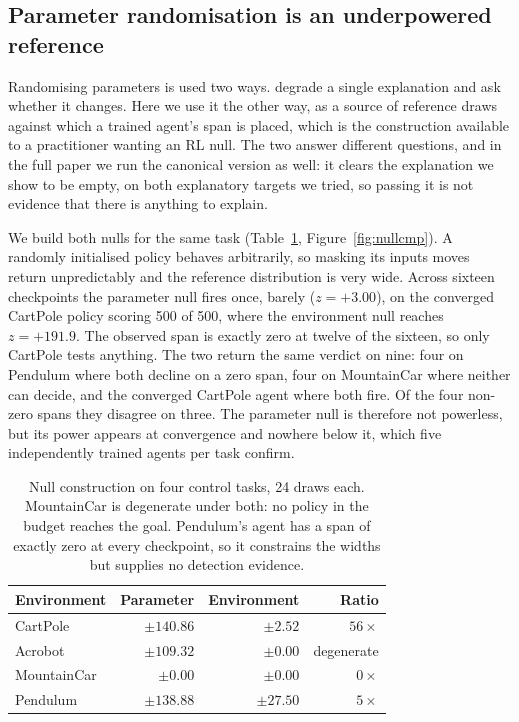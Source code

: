 \documentclass[10pt,twocolumn]{article}
\begin{document}
\subsection{Parameter randomisation is an underpowered reference}

Randomising parameters is used two ways. \citet{adebayo2018sanity} degrade a
single explanation and ask whether it changes. Here we use it the other way, as
a source of reference draws against which a trained agent's span is placed,
which is the construction available to a practitioner wanting an RL null. The
two answer different questions, and in the full paper we run the canonical
version as well: it clears the explanation we show to be empty, on both
explanatory targets we tried, so passing it is not evidence that there is
anything to explain.

We build both nulls for the same task (Table~\ref{tab:nulls},
Figure~\ref{fig:nullcmp}). A randomly initialised policy behaves arbitrarily, so
masking its inputs moves return unpredictably and the reference distribution is
very wide. Across sixteen checkpoints the parameter null fires once, barely
($z=+3.00$), on the converged CartPole policy scoring 500 of 500, where the
environment null reaches $z=+191.9$. The observed span is exactly zero at twelve
of the sixteen, so only CartPole tests anything. The two return the same verdict
on nine: four on Pendulum where both decline on a zero span, four on MountainCar
where neither can decide, and the converged CartPole agent where both fire. Of
the four non-zero spans they disagree on three. The parameter null is therefore
not powerless, but its power appears at convergence and nowhere below it, which
five independently trained agents per task confirm.

\begin{table}[t]
\centering\small
\caption{Null construction on four control tasks, 24 draws each. MountainCar is degenerate under both: no policy in the budget reaches the goal. Pendulum's agent has a span of exactly zero at every checkpoint, so it constrains the widths but supplies no detection evidence.}
\label{tab:nulls}
\begin{tabular}{lrrr}
\toprule
Environment & Parameter & Environment & Ratio \\
\midrule
CartPole & $\pm \mathbf{140.86}$ & $\pm \mathbf{2.52}$ & $56\times$ \\
Acrobot & $\pm \mathbf{109.32}$ & $\pm \mathbf{0.00}$ & degenerate \\
MountainCar & $\pm \mathbf{0.00}$ & $\pm \mathbf{0.00}$ & $0\times$ \\
Pendulum & $\pm \mathbf{138.88}$ & $\pm \mathbf{27.50}$ & $5\times$ \\
\bottomrule
\end{tabular}
\end{table}
\end{document}
